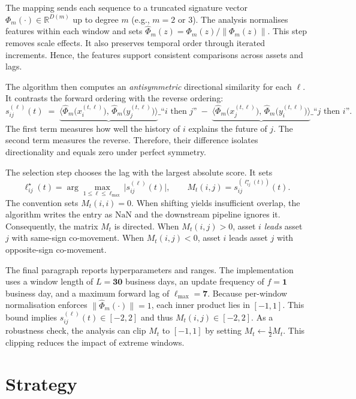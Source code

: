 The mapping sends each sequence to a truncated signature vector $\Phi_m(\cdot)\in\mathbb{R}^{D(m)}$ up to degree $m$ (e.g., $m=2$ or $3$). The analysis normalises features within each window and sets
$\widehat\Phi_m(z)=\Phi_m(z)/\|\Phi_m(z)\|$. This step removes scale effects. It also preserves temporal order through iterated increments. Hence, the features support consistent comparisons across assets and lags.

The algorithm then computes an \emph{antisymmetric} directional similarity for each $\ell$. It contrasts the forward ordering with the reverse ordering:
\[
s^{(\ell)}_{ij}(t)
\;=\;
\underbrace{\big\langle \widehat\Phi_m\!\big(x^{(t,\ell)}_{i}\big),\,
\widehat\Phi_m\!\big(y^{(t,\ell)}_{j}\big)\big\rangle}\_{\text{``$i$ then $j$''}}
\;-\;
\underbrace{\big\langle \widehat\Phi_m\!\big(x^{(t,\ell)}_{j}\big),\,
\widehat\Phi_m\!\big(y^{(t,\ell)}_{i}\big)\big\rangle}\_{\text{``$j$ then $i$''}}.
\]
The first term measures how well the history of $i$ explains the future of $j$. The second term measures the reverse. Therefore, their difference isolates directionality and equals zero under perfect symmetry.

The selection step chooses the lag with the largest absolute score. It sets
\[
\ell^\star_{ij}(t)=\arg\max_{1\le \ell\le \ell_{\max}} \big|s^{(\ell)}_{ij}(t)\big|,
\qquad
M_t(i,j)=s^{(\ell^\star_{ij}(t))}_{ij}(t).
\]
The convention sets $M_t(i,i)=0$. When shifting yields insufficient overlap, the algorithm writes the entry as $\mathrm{NaN}$ and the downstream pipeline ignores it. Consequently, the matrix $M_t$ is directed. When $M_t(i,j)>0$, asset $i$ \emph{leads} asset $j$ with same-sign co-movement. When $M_t(i,j)<0$, asset $i$ leads asset $j$ with opposite-sign co-movement.

The final paragraph reports hyperparameters and ranges. The implementation uses a window length of $L=\mathbf{30}$ business days, an update frequency of $f=\mathbf{1}$ business day, and a maximum forward lag of $\ell_{\max}=\mathbf{7}$. Because per-window normalisation enforces $\|\widehat\Phi_m(\cdot)\|=1$, each inner product lies in $[-1,1]$. This bound implies $s^{(\ell)}_{ij}(t)\in[-2,2]$ and thus $M_t(i,j)\in[-2,2]$. As a robustness check, the analysis can clip $M_t$ to $[-1,1]$ by setting $M_t\leftarrow \tfrac{1}{2}M_t$. This clipping reduces the impact of extreme windows.

\section{Strategy}\label{sec:strategy}

